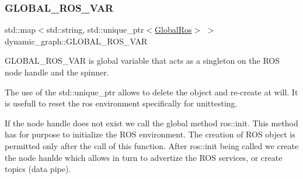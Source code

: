 \subsubsection{\texorpdfstring{G\+L\+O\+B\+A\+L\+\_\+\+R\+O\+S\+\_\+\+V\+AR}{GLOBAL\_ROS\_VAR}}
{\footnotesize\ttfamily std\+::map$<$std\+::string, std\+::unique\+\_\+ptr$<$\hyperlink{structdynamic__graph_1_1GlobalRos}{Global\+Ros}$>$ $>$ dynamic\+\_\+graph\+::\+G\+L\+O\+B\+A\+L\+\_\+\+R\+O\+S\+\_\+\+V\+AR\hspace{0.3cm}{\ttfamily [static]}}



G\+L\+O\+B\+A\+L\+\_\+\+R\+O\+S\+\_\+\+V\+AR is global variable that acts as a singleton on the R\+OS node handle and the spinner. 

The use of the std\+::unique\+\_\+ptr allows to delete the object and re-\/create at will. It is usefull to reset the ros environment specifically for unittesting.

If the node handle does not exist we call the global method ros\+::init. This method has for purpose to initialize the R\+OS environment. The creation of R\+OS object is permitted only after the call of this function. After ros\+::init being called we create the node hanlde which allows in turn to advertize the R\+OS services, or create topics (data pipe). 